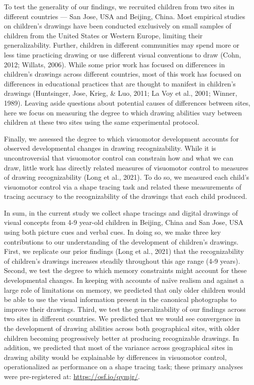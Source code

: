 \documentclass[
  english,
  man]{apa6}
\begin{document}
To test the generality of our findings, we recruited children from two sites in different countries --- San Jose, USA and Beijing, China.
Most empirical studies on children's drawings have been conducted exclusively on small samples of children from the United States or Western Europe, limiting their generalizability. Further, children in different communities may spend more or less time practicing drawing or use different visual conventions to draw (Cohn, 2012; Willats, 2006). While some prior work has focused on differences in children's drawings across different countries, most of this work has focused on differences in educational practices that are thought to manifest in children's drawings (Huntsinger, Jose, Krieg, \& Luo, 2011; La Voy et al., 2001; Winner, 1989). Leaving aside questions about potential causes of differences between sites, here we focus on measuring the degree to which drawing abilities vary between children at these two sites using the same experimental protocol.

Finally, we assessed the degree to which visuomotor development accounts for observed developmental changes in drawing recognizability. While it is uncontroversial that visuomotor control can constrain how and what we can draw, little work has directly related measures of visuomotor control to measures of drawing recognizability (Long et al., 2021). To do so, we measured each child's visuomotor control via a shape tracing task and related these measurements of tracing accuracy to the recognizability of the drawings that each child produced.

In sum, in the current study we collect shape tracings and digital drawings of visual concepts from 4-9 year-old children in Beijing, China and San Jose, USA using both picture cues and verbal cues. In doing so, we make three key contributions to our understanding of the development of children's drawings. First, we replicate our prior findings (Long et al., 2021) that the recognizability of children's drawings increases steadily throughout this age range (4-9 years). Second, we test the degree to which memory constraints might account for these developmental changes. In keeping with accounts of naïve realism and against a large role of limitations on memory, we predicted that only older children would be able to use the visual information present in the canonical photographs to improve their drawings. Third, we test the generalizability of our findings across two sites in different countries. We predicted that we would see convergence in the development of drawing abilities across both geographical sites, with older children becoming progressively better at producing recognizable drawings. In addition, we predicted that most of the variance across geographical sites in drawing ability would be explainable by differences in visuomotor control, operationalized as performance on a shape tracing task; these primary analyses were pre-registered at: \url{https://osf.io/qymjr/}.
\end{document}
